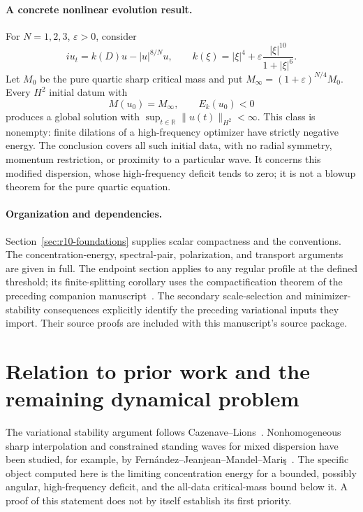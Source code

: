 \documentclass[11pt,a4paper]{article}
\theoremstyle{remark}\newtheorem{remark}[theorem]{Remark}
\begin{document}
\paragraph{A concrete nonlinear evolution result.}
For $N=1,2,3$, $\varepsilon>0$, consider
\[
 iu_t=k(D)u-|u|^{8/N}u,\qquad
 k(\xi)=|\xi|^4+\varepsilon\frac{|\xi|^{10}}{1+|\xi|^6}.
\]
Let $M_0$ be the pure quartic sharp critical mass and put
$M_\infty=(1+\varepsilon)^{N/4}M_0$.
Every $H^2$ initial datum with
\[
 M(u_0)=M_\infty,\qquad E_k(u_0)<0
\]
produces a global solution with $\sup_{t\in\mathbb R}\|u(t)\|_{H^2}<\infty$.
This class is nonempty: finite dilations of a high-frequency optimizer
have strictly negative energy. The conclusion covers all such initial
data, with no radial symmetry, momentum restriction, or proximity to a
particular wave. It concerns this modified dispersion, whose high-frequency
deficit tends to zero; it is not a blowup theorem for the pure quartic
equation.

\paragraph{Organization and dependencies.}
Section~\ref{sec:r10-foundations} supplies scalar compactness and the
conventions. The concentration-energy, spectral-pair, polarization, and
transport arguments are given in full. The endpoint section applies to
any regular profile at the defined threshold; its finite-splitting
corollary uses the compactification theorem of the preceding companion
manuscript~\cite{companion}. The secondary scale-selection and
minimizer-stability consequences explicitly identify the preceding
variational inputs they import. Their source proofs are included with
this manuscript's source package.








\section{Relation to prior work and the remaining dynamical problem}
The variational stability argument follows Cazenave--Lions~\cite{CL}.
Nonhomogeneous sharp interpolation and constrained standing waves for
mixed dispersion have been studied, for example, by
Fern\'andez--Jeanjean--Mandel--Mari\c{s}~\cite{FJMM}.
The specific object computed here is the limiting concentration energy
for a bounded, possibly angular, high-frequency deficit, and the
all-data critical-mass bound below it. A proof of this statement does
not by itself establish its first priority.
\end{document}
